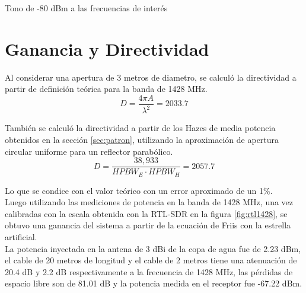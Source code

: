 \begin{images}{Tono de -80 dBm a las frecuencias de interés}

    \imagesnewline


    \imagesnewline


\end{images}

\section{Ganancia y Directividad}

Al considerar una apertura de 3 metros de diametro, se calculó la directividad a partir de definición teórica para la banda de 1428 MHz.\\

\begin{equation}
    D = \frac{4\pi A}{\lambda^2} = 2033.7
\end{equation}

También se calculó la directividad a partir de los Hazes de media potencia obtenidos en la sección \ref{sec:patron}, utilizando la aproximación de apertura circular uniforme para un reflector parabólico.\\

\begin{equation}
    D = \frac{38,933}{HPBW_{E}\cdot HPBW_{H}} = 2057.7
\end{equation}

Lo que se condice con el valor teórico con un error aproximado de un 1\%.\\

Luego utilizando las mediciones de potencia en la banda de 1428 MHz, una vez calibradas con la escala obtenida con la RTL-SDR en la figura \ref{fig:rtl1428}, se obtuvo una ganancia del sistema a partir de la ecuación de Friis con la estrella artificial.\\

La potencia inyectada en la antena de 3 dBi de la copa de agua fue de 2.23 dBm, el cable de 20 metros de longitud y el cable de 2 metros tiene una atenuación de 20.4 dB y 2.2 dB respectivamente a la frecuencia de 1428 MHz, las pérdidas de espacio libre son de 81.01 dB y la potencia medida en el receptor fue -67.22 dBm.\\

